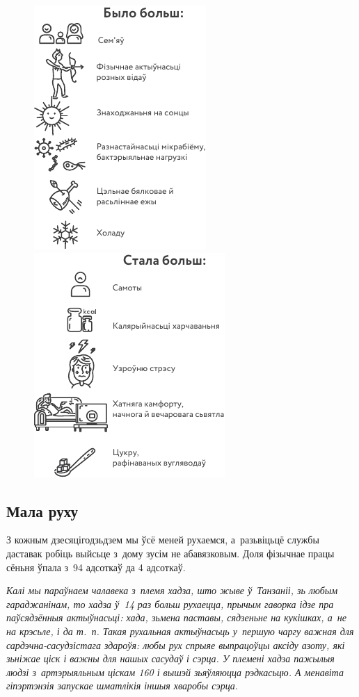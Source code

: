 \begin{figure}[htb!]
  \centering
  \includegraphics[align=t,scale=1.5]{willpower/ch2/4.pdf}\qquad\qquad
  \includegraphics[align=t,scale=1.5]{willpower/ch2/5.pdf}
\end{figure}

\subsection*{Мала руху}

З кожным дзесяцігодзьдзем мы ўсё меней рухаемся, а~разьвіцьцё службы даставак робіць выйсьце з~дому зусім не абавязковым. Доля фізычнае працы сёньня ўпала з~94 адсоткаў да 4 адсоткаў. 

\emph{Калі мы параўнаем чалавека з~племя хадза, што жыве ў~Танзаніі, зь любым гараджанінам, то хадза ў~14 раз больш рухаецца, прычым гаворка ідзе пра паўсядзённыя актыўнасьці: хада, зьмена паставы, сядзеньне на кукішках, а~не на крэсьле, і да т.~п. Такая рухальная актыўнасьць у~першую чаргу важная для сардэчна-сасудзістага здароўя: любы рух спрыяе выпрацоўцы аксіду азоту, які зьніжае ціск і важны для нашых сасудаў і сэрца. У племені хадза пажылыя людзі з~артэрыяльным ціскам 160 і вышэй зьяўляюцца рэдкасьцю. А менавіта гіпэртэнзія запускае шматлікія іншыя хваробы сэрца.}

